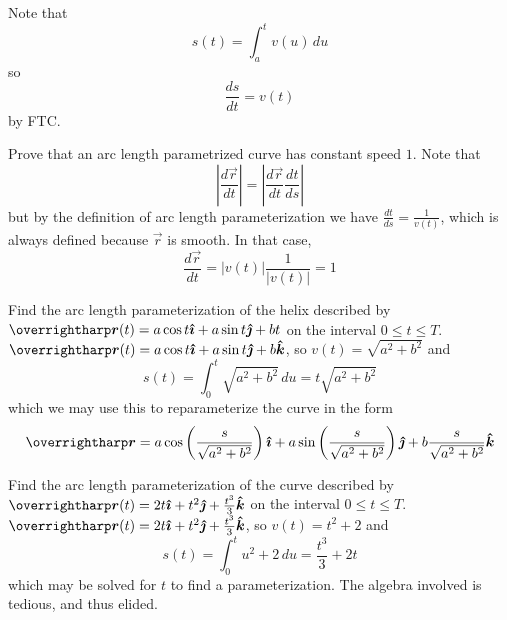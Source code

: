 \documentclass[../main.tex]{subfiles}
\begin{document}
        Note that
        \[
        s(t) = \int_a^t v(u)\,du
        \]
        so
        \[
        \frac{ds}{dt}=v(t)
        \]
        by FTC.
        \begin{theorem}{}{}
                Prove that an arc length parametrized curve has constant speed \(1\).
                \tcblower
                Note that
                \[
                \left|\frac{d\vec{r}}{dt}\right|=\left|\frac{d\vec{r}}{dt}\frac{dt}{ds}\right|
                \]
                but by the definition of arc length parameterization we have \(\frac{dt}{ds}=\frac{1}{v(t)}\), which is always defined because \(\vec{r}\) is smooth. In that case,
                \[
                \frac{d\vec{r}}{dt}=|v(t)|\frac{1}{|v(t)|}=1
                \]
        \end{theorem}
        \begin{example}{}{}
                Find the arc length parameterization of the helix described by \(\vec{r}(t)=a\cos{t}\i+a\sin{t}\j+bt\) on the interval \(0\leq t \leq T\).
                \tcblower
                \(\vec{r}(t)=a\cos{t}\i+a\sin{t}\j+b\k\), so \(v(t)=\sqrt{a^2+b^2}\) and
                \[
                s(t) = \int_0^t \sqrt{a^2+b^2}\,du = t\sqrt{a^2+b^2}
                \]
                which we may use this to reparameterize the curve in the form
                \[
                        \vec{r}=a\cos\left(\frac{s}{\sqrt{a^2+b^2}}\right)\i + a\sin\left(\frac{s}{\sqrt{a^2+b^2}}\right)\j + b\frac{s}{\sqrt{a^2+b^2}}\k
                \]
        \end{example}
        \begin{example}{}{}
                Find the arc length parameterization of the curve described by \(\vec{r}(t)=2t\i+t^2\j+\frac{t^3}{3}\k\) on the interval \(0 \leq t \leq T\).
                \tcblower
                \(\vec{r}(t)=2t\i+t^2\j+\frac{t^3}{3}\k\), so \(v(t)=t^2+2\) and
                \[
                s(t) = \int_0^tu^2+2\,du = \frac{t^3}{3}+2t
                \]
                which may be solved for \(t\) to find a parameterization. The algebra involved is tedious, and thus elided.
        \end{example}
\end{document}

